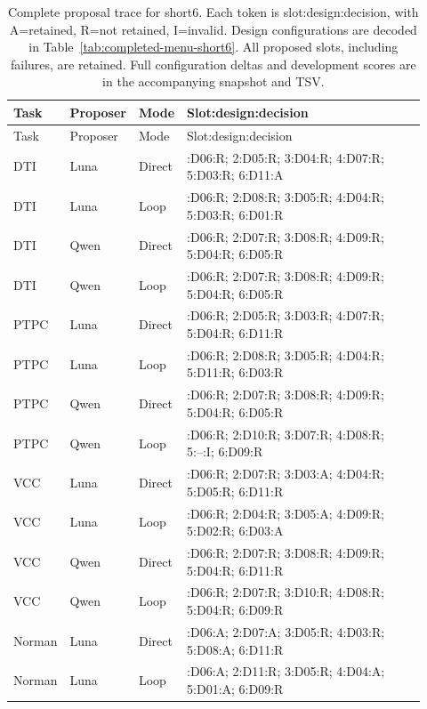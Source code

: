 \begingroup\small
\setlength{\tabcolsep}{3pt}
\begin{longtable}{@{}p{0.10\linewidth}p{0.08\linewidth}p{0.08\linewidth}>{\raggedright\arraybackslash}p{0.66\linewidth}@{}}
\caption{Complete proposal trace for short6. Each token is slot:design:decision, with A=retained, R=not retained, I=invalid. Design configurations are decoded in Table~\ref{tab:completed-menu-short6}. All proposed slots, including failures, are retained. Full configuration deltas and development scores are in the accompanying snapshot and TSV.}\label{tab:completed-trace-short6}\\
\toprule Task & Proposer & Mode & Slot:design:decision \\ \midrule\endfirsthead
\toprule Task & Proposer & Mode & Slot:design:decision \\ \midrule\endhead
\bottomrule\endfoot
DTI & Luna & Direct & 1:D06:R; 2:D05:R; 3:D04:R; 4:D07:R; 5:D03:R; 6:D11:A \\[3pt]
DTI & Luna & Loop & 1:D06:R; 2:D08:R; 3:D05:R; 4:D04:R; 5:D03:R; 6:D01:R \\[3pt]
DTI & Qwen & Direct & 1:D06:R; 2:D07:R; 3:D08:R; 4:D09:R; 5:D04:R; 6:D05:R \\[3pt]
DTI & Qwen & Loop & 1:D06:R; 2:D07:R; 3:D08:R; 4:D09:R; 5:D04:R; 6:D05:R \\[3pt]
PTPC & Luna & Direct & 1:D06:R; 2:D05:R; 3:D03:R; 4:D07:R; 5:D04:R; 6:D11:R \\[3pt]
PTPC & Luna & Loop & 1:D06:R; 2:D08:R; 3:D05:R; 4:D04:R; 5:D11:R; 6:D03:R \\[3pt]
PTPC & Qwen & Direct & 1:D06:R; 2:D07:R; 3:D08:R; 4:D09:R; 5:D04:R; 6:D05:R \\[3pt]
PTPC & Qwen & Loop & 1:D06:R; 2:D10:R; 3:D07:R; 4:D08:R; 5:--:I; 6:D09:R \\[3pt]
VCC & Luna & Direct & 1:D06:R; 2:D07:R; 3:D03:A; 4:D04:R; 5:D05:R; 6:D11:R \\[3pt]
VCC & Luna & Loop & 1:D06:R; 2:D04:R; 3:D05:A; 4:D09:R; 5:D02:R; 6:D03:A \\[3pt]
VCC & Qwen & Direct & 1:D06:R; 2:D07:R; 3:D08:R; 4:D09:R; 5:D04:R; 6:D11:R \\[3pt]
VCC & Qwen & Loop & 1:D06:R; 2:D07:R; 3:D10:R; 4:D08:R; 5:D04:R; 6:D09:R \\[3pt]
Norman & Luna & Direct & 1:D06:A; 2:D07:A; 3:D05:R; 4:D03:R; 5:D08:A; 6:D11:R \\[3pt]
Norman & Luna & Loop & 1:D06:A; 2:D11:R; 3:D05:R; 4:D04:A; 5:D01:A; 6:D09:R \\[3pt]

\end{longtable}

